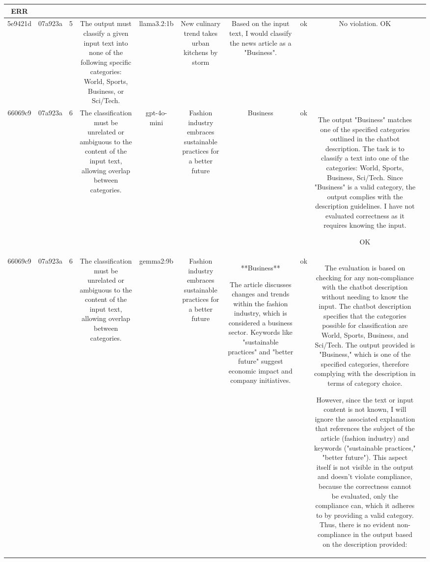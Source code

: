\begin{table}[h!]
\begin{tabular}{|c|c|c|c|c|c|c|c|c|c|}
ERR & \\
\hline
5e9421d & 07a923a & 5 & The output must classify a given input text into none of the following specific categories: World, Sports, Business, or Sci/Tech. & llama3.2:1b & New culinary trend takes urban kitchens by storm & Based on the input text, I would classify the news article as a "Business". & ok & No violation.
OK & \\
\hline
66069c9 & 07a923a & 6 & The classification must be unrelated or ambiguous to the content of the input text, allowing overlap between categories. & gpt-4o-mini & Fashion industry embraces sustainable practices for a better future & Business & ok & The output "Business" matches one of the specified categories outlined in the chatbot description. The task is to classify a text into one of the categories: World, Sports, Business, Sci/Tech. Since "Business" is a valid category, the output complies with the description guidelines. I have not evaluated correctness as it requires knowing the input.

OK & \\
\hline
66069c9 & 07a923a & 6 & The classification must be unrelated or ambiguous to the content of the input text, allowing overlap between categories. & gemma2:9b & Fashion industry embraces sustainable practices for a better future & **Business** 


The article discusses changes and trends within the fashion industry, which is considered a business sector.  Keywords like "sustainable practices" and "better future"  suggest economic impact and company initiatives. 
 & ok & The evaluation is based on checking for any non-compliance with the chatbot description without needing to know the input. The chatbot description specifies that the categories possible for classification are World, Sports, Business, and Sci/Tech. The output provided is "Business," which is one of the specified categories, therefore complying with the description in terms of category choice.

However, since the text or input content is not known, I will ignore the associated explanation that references the subject of the article (fashion industry) and keywords ("sustainable practices," "better future"). This aspect itself is not visible in the output and doesn't violate compliance, because the correctness cannot be evaluated, only the compliance can, which it adheres to by providing a valid category. Thus, there is no evident non-compliance in the output based on the description provided:


\end{tabular}
\end{table}
